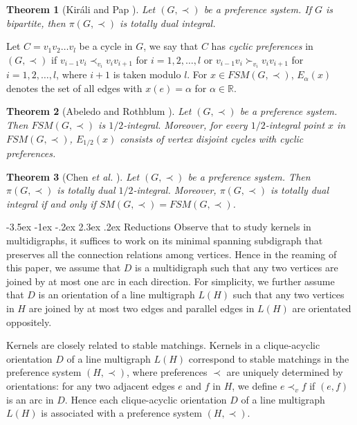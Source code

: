 \documentclass[11pt]{article}
\makeatletter
\newtheorem{theorem}{Theorem}%
\numberwithin{theorem}{section}
\renewcommand\section{%
  \@startsection{section}{1}
                {\z@}%
                {-3.5ex \@plus -1ex \@minus -.2ex}%
                {2.3ex \@plus.2ex}%
                {\large\bfseries}%
}
\makeatother
\begin{document}
\begin{theorem}[Kir\'{a}li and Pap \cite{KiraPap08}]
\label{thm:KiraPap08}
Let $(G,\prec)$ be a preference system. If $G$ is bipartite, then $\pi(G,\prec)$ is totally dual integral.
\end{theorem}

Let $C=v_1 v_2 \ldots v_l$ be a cycle in $G$, we say that $C$ has \textit{cyclic preferences} in $(G,\prec)$ if
$v_{i-1} v_i \prec_{v_i} v_i v_{i+1}$ for $i=1,2,\ldots,l$
or $v_{i-1} v_i\succ_{v_i} v_i v_{i+1}$ for $i=1,2,\ldots,l$,
where $i+1$ is taken modulo $l$.
For $x\in FSM(G,\prec)$, $E_{\alpha}(x)$ denotes the set of all edges with $x(e)=\alpha$ for $\alpha\in\mathbb{R}$.

\begin{theorem}[Abeledo and Rothblum \cite{AbelRoth94}]
\label{thm:AbelRoth94}
Let $(G,\prec)$ be a preference system. Then $FSM(G,\prec)$ is $1/2$-integral. Moreover, for every $1/2$-integral point $x$ in $FSM(G,\prec)$, $E_{1/2}(x)$ consists of vertex disjoint cycles with cyclic preferences.
\end{theorem} 

\begin{theorem}[Chen \textit{et al.} \cite{ChenDing12}]
\label{thm:ChenDing12}
Let $(G,\prec)$ be a preference system. Then $\pi(G,\prec)$ is totally dual $1/2$-integral. Moreover, $\pi(G,\prec)$ is totally dual integral if and only if $SM(G,\prec)=FSM(G,\prec)$.
\end{theorem}

\section{Reductions}
Observe that to study kernels in multidigraphs, it suffices to work on its minimal spanning subdigraph that  preserves all the connection relations among vertices. Hence in the reaming of this paper, we assume that $D$ is a multidigraph such that any two vertices are joined by at most one arc in each direction. For simplicity, we further assume that $D$ is an orientation of a line multigraph $L(H)$ such that any two vertices in $H$ are joined by at most two edges and parallel edges in $L(H)$ are orientated oppositely.

Kernels are closely related to stable matchings. Kernels in a clique-acyclic orientation $D$ of a line multigraph $L(H)$ correspond to stable matchings in the preference system $(H,\prec)$, where preferences $\prec$ are uniquely determined by orientations: for any two adjacent edges $e$ and $f$ in $H$, we define $e\prec_v f$ if $(e,f)$ is an arc in $D$. 
Hence each clique-acyclic orientation $D$ of a line multigraph $L(H)$ is associated with a preference system $(H,\prec)$.
\end{document}
